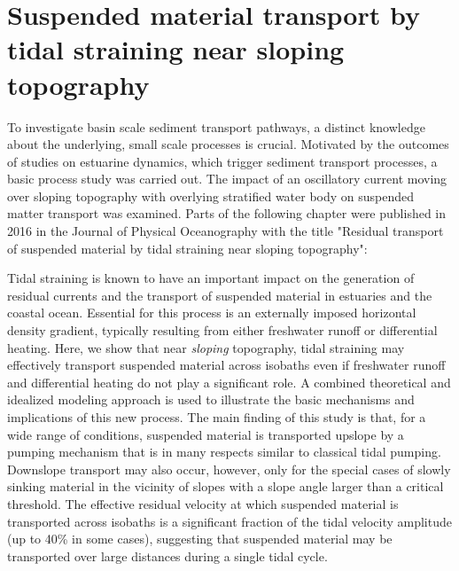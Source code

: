 \chapter{Suspended material transport by tidal straining
  near sloping topography}
\label{kap-slope}

To investigate basin scale sediment transport pathways, a distinct knowledge about the underlying, small scale processes is crucial. Motivated by the outcomes of studies on estuarine dynamics, which trigger sediment transport processes, a basic process study was carried out. The impact of an oscillatory current moving over sloping topography with overlying stratified water body on suspended matter transport was examined. Parts of the following chapter were published in 2016 in the Journal of Physical Oceanography with the title "Residual transport of suspended material by tidal straining near sloping topography":

Tidal straining is known to have an important impact on the
  generation of residual currents and the transport of suspended
  material in estuaries and the coastal ocean. Essential for this
  process is an externally imposed horizontal density gradient,
  typically resulting from either freshwater runoff or differential
  heating. Here, we show that near \emph{sloping} topography, tidal
  straining may effectively transport suspended material across
  isobaths even if freshwater runoff and differential heating do not
  play a significant role. A combined theoretical and idealized
  modeling approach is used to illustrate the basic mechanisms and
  implications of this new process. The main finding of this study is
  that, for a wide range of conditions, suspended material is
  transported upslope by a pumping mechanism that is in many respects
  similar to classical tidal pumping. Downslope transport may also
  occur, however, only for the special cases of slowly sinking
  material in the vicinity of slopes with a slope angle larger than a
  critical threshold. The effective residual velocity at which
  suspended material is transported across isobaths is a significant
  fraction of the tidal velocity amplitude (up to 40\% in some cases),
  suggesting that suspended material may be transported over large
  distances during a single tidal cycle. \citep{schulz2016}


